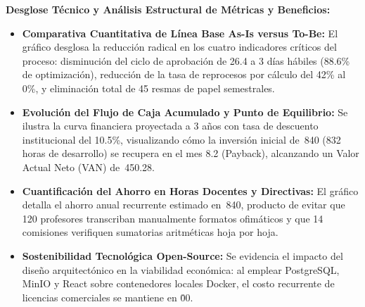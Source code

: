 \documentclass[12pt,a4paper]{article}
\begin{document}
\noindent
\noindent
\textbf{Desglose Técnico y Análisis Estructural de Métricas y Beneficios:}
\begin{itemize}[leftmargin=1.5em, itemsep=3pt]
    \item \textbf{Comparativa Cuantitativa de Línea Base As-Is versus To-Be:} El gráfico desglosa la reducción radical en los cuatro indicadores críticos del proceso: disminución del ciclo de aprobación de 26.4 a 3 días hábiles (88.6\% de optimización), reducción de la tasa de reprocesos por cálculo del 42\% al 0\%, y eliminación total de 45 resmas de papel semestrales.
    \item \textbf{Evolución del Flujo de Caja Acumulado y Punto de Equilibrio:} Se ilustra la curva financiera proyectada a 3 años con tasa de descuento institucional del 10.5\%, visualizando cómo la inversión inicial de \,840 (832 horas de desarrollo) se recupera en el mes 8.2 (Payback), alcanzando un Valor Actual Neto (VAN) de \,450.28.
    \item \textbf{Cuantificación del Ahorro en Horas Docentes y Directivas:} El gráfico detalla el ahorro anual recurrente estimado en \,840, producto de evitar que 120 profesores transcriban manualmente formatos ofimáticos y que 14 comisiones verifiquen sumatorias aritméticas hoja por hoja.
    \item \textbf{Sostenibilidad Tecnológica Open-Source:} Se evidencia el impacto del diseño arquitectónico en la viabilidad económica: al emplear PostgreSQL, MinIO y React sobre contenedores locales Docker, el costo recurrente de licencias comerciales se mantiene en \.00.
\end{itemize}
\end{document}
